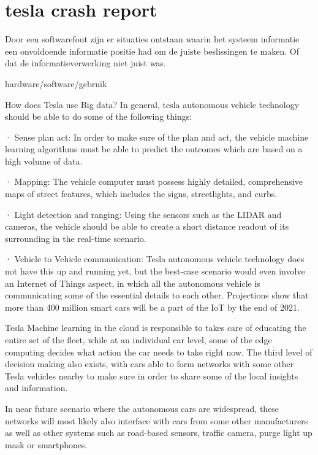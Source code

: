 

\section{tesla crash report}
Door een softwarefout zijn er situaties ontstaan waarin het systeem informatie een onvoldoende informatie positie had om de juiste beslissingen te maken. Of dat de informatieverwerking niet juist was.












hardware/software/gebruik

How does Tesla use Big data?
In general, tesla autonomous vehicle technology should be able to do some of the following things:

· Sense plan act: In order to make sure of the plan and act, the vehicle machine learning algorithms must be able to predict the outcomes which are based on a high volume of data.

· Mapping: The vehicle computer must possess highly detailed, comprehensive maps of street features, which includes the signs, streetlights, and curbs.

· Light detection and ranging: Using the sensors such as the LIDAR and cameras, the vehicle should be able to create a short distance readout of its surrounding in the real-time scenario.

· Vehicle to Vehicle communication: Tesla autonomous vehicle technology does not have this up and running yet, but the best-case scenario would even involve an Internet of Things aspect, in which all the autonomous vehicle is communicating some of the essential details to each other. Projections show that more than 400 million smart cars will be a part of the IoT by the end of 2021.


Tesla Machine learning in the cloud is responsible to takes care of educating the entire set of the fleet, while at an individual car level, some of the edge computing decides what action the car needs to take right now. The third level of decision making also exists, with cars able to form networks with some other Tesla vehicles nearby to make sure in order to share some of the local insights and information.

In near future scenario where the autonomous cars are widespread, these networks will most likely also interface with cars from some other manufacturers as well as other systems such as road-based sensors, traffic camera, purge light up mask or smartphones.

